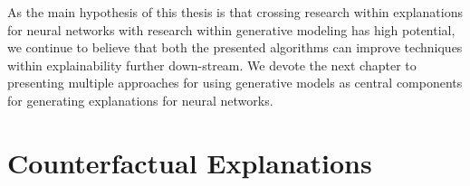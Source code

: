 \documentclass[11pt,a4paper,twoside,openright,final]{memoir}
\begin{document}
As the main hypothesis of this thesis is that crossing research within explanations for neural networks with research within generative modeling has high potential, we continue to believe that both the presented algorithms can improve techniques within explainability further down-stream.
We devote the next chapter to presenting multiple approaches for using generative models as central components for generating explanations for neural networks. 




\chapter{Counterfactual Explanations} \label{chap:ecinn-main}
\end{document}
